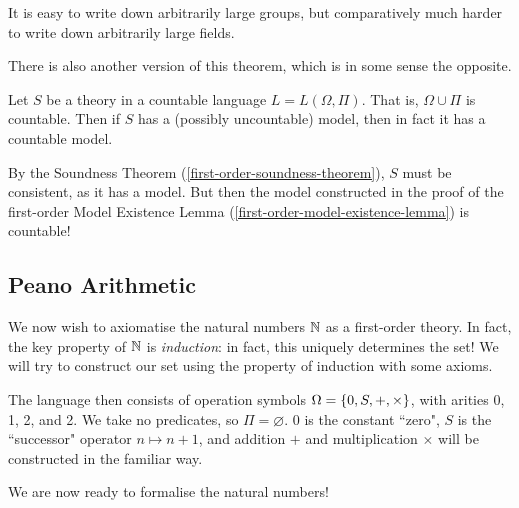\documentclass{article}
\begin{document}
\begin{note}
	It is easy to write down arbitrarily large groups, but comparatively much harder to write down arbitrarily large fields.
\end{note}

There is also another version of this theorem, which is in some sense the opposite.

\begin{theorem}
	\label{downward-lowenheim-skolem}
    Let $S$ be a theory in a countable language $L = L(\Omega, \Pi)$. That is, $\Omega \cup \Pi$ is countable. Then if $S$ has a (possibly uncountable) model, then in fact it has a countable model.
\end{theorem}

\begin{prf}
    By the Soundness Theorem (\ref{first-order-soundness-theorem}), $S$ must be consistent, as it has a model. But then the model constructed in the proof of the first-order Model Existence Lemma (\ref{first-order-model-existence-lemma}) is countable!
\end{prf}


\subsection{Peano Arithmetic}
\label{section-first-order-peano-arithmetic}

We now wish to axiomatise the natural numbers $\mathbb{N}$ as a first-order theory. In fact, the key property of $\mathbb{N}$ is \textit{induction}: in fact, this uniquely determines the set! We will try to construct our set using the property of induction with some axioms.

The language then consists of operation symbols $\Omega = \left\lbrace 0, S, +, \times \right\rbrace$, with arities 0, 1, 2, and 2. We take no predicates, so $\Pi = \varnothing$. 0 is the constant ``zero", $S$ is the ``successor" operator $n \mapsto n + 1$, and addition $+$ and multiplication $\times$ will be constructed in the familiar way.

We are now ready to formalise the natural numbers!
\end{document}
